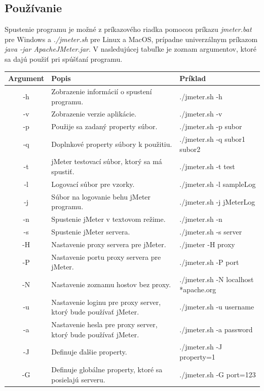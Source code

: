 \documentclass[12pt,oneside,final]{fithesis-utf8}
\begin{document}
\subsection{Používanie}
Spustenie programu je možné z príkazového riadka pomocou príkazu \textit{jmeter.bat} pre Windows a \textit{./jmeter.sh} pre Linux a MacOS, prípadne univerzálnym príkazom \textit{java -jar ApacheJMeter.jar}. V nasledujúcej tabuľke je zoznam argumentov, ktoré sa dajú použiť pri spúšťaní programu.
\begin{table}[h!]
\begin{center}
\begin{tabular}{| c | p{8cm} | p{5cm} |}
	\hline
	Argument & Popis & Príklad \\ \hline
	-h & Zobrazenie informácií o spustení programu. & ./jmeter.sh -h \\ \hline
	-v & Zobrazenie verzie aplikácie. & ./jmeter.sh -v \\ \hline
	-p & Použije sa zadaný property súbor. & ./jmeter.sh -p subor \\ \hline
	-q & Doplnkové property súbory k použitiu. & ./jmeter.sh -q subor1 subor2 \\ \hline
	-t & jMeter testovací súbor, ktorý sa má spustiť. & ./jmeter.sh -t test \\ \hline
	-l & Logovací súbor pre vzorky. & ./jmeter.sh -l sampleLog \\ \hline
	-j & Súbor na logovanie behu jMeter programu. & ./jmeter.sh -j jMeterLog \\ \hline
	-n & Spustenie jMeter v textovom režime. & ./jmeter.sh -n \\ \hline
	-s & Spustenie jMeter servera. & ./jmeter.sh -s server \\ \hline
	-H & Nastavenie proxy servera pre jMeter. & ./jmeter -H proxy \\ \hline
	-P & Nastavenie portu proxy servera pre jMeter. & ./jmeter.sh -P port \\ \hline
	-N & Nastavenie zoznamu hostov bez proxy. & ./jmeter.sh -N localhost *apache.org \\ \hline
	-u & Nastavenie loginu pre proxy server, ktorý bude používať jMeter. & ./jmeter.sh -u username \\ \hline
	-a & Nastavenie hesla pre proxy server, ktorý bude používať jMeter. & ./jmeter.sh -a password \\ \hline
	-J & Definuje ďalšie property. & ./jmeter.sh -J property=1 \\ \hline
	-G & Definuje globálne property, ktoré sa posielajú serveru. & ./jmeter.sh -G port=123 \\ \hline

\end{tabular}
\end{center}
\end{table}
\end{document}
